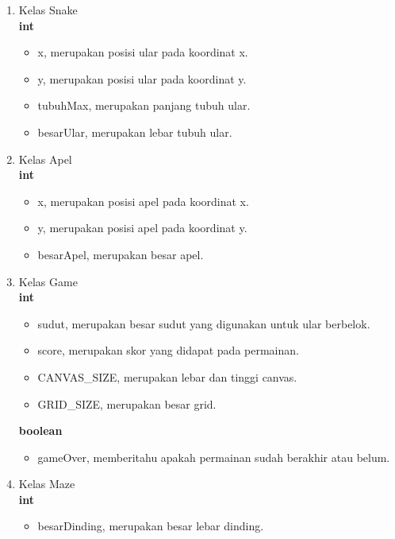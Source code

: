 \begin{enumerate}
	\item Kelas Snake\\
\textbf{int}

\begin{itemize}
	\item x, merupakan posisi ular pada koordinat x.
	\item y, merupakan posisi ular pada koordinat y.
	\item tubuhMax, merupakan panjang tubuh ular.
	\item besarUlar, merupakan lebar tubuh ular.
\end{itemize}

	\item Kelas Apel\\
	\textbf{int}
	
\begin{itemize}
	\item x, merupakan posisi apel pada koordinat x.
	\item y, merupakan posisi apel pada koordinat y.
	\item besarApel, merupakan besar apel.
\end{itemize}

\item Kelas Game \\
\textbf{int}

\begin{itemize}
	\item sudut, merupakan besar sudut yang digunakan untuk ular berbelok.
	\item score, merupakan skor yang didapat pada permainan.
	\item CANVAS\_SIZE, merupakan lebar dan tinggi canvas.
	\item GRID\_SIZE, merupakan besar grid.
\end{itemize}

\textbf{boolean}
\begin{itemize}
	\item gameOver, memberitahu apakah permainan sudah berakhir atau belum.
\end{itemize}

\item Kelas Maze \\
\textbf{int}

\begin{itemize}
	\item besarDinding, merupakan besar lebar dinding.
\end{itemize}

\end{enumerate}